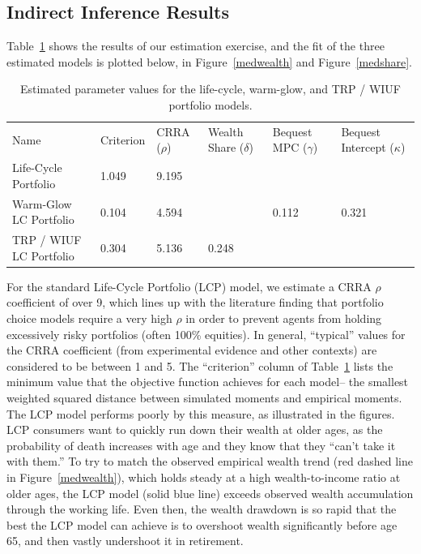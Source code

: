 \documentclass{article}
\newcommand{\CRRA}{\rho}
\begin{document}
\subsection{Indirect Inference Results}

Table~\ref{parameters} shows the results of our estimation exercise, and the fit of the three estimated models is plotted below, in Figure~\ref{medwealth} and Figure~\ref{medshare}.

\begin{table}
\centering
\caption[]{Estimated parameter values for the life-cycle, warm-glow, and TRP / WIUF portfolio models.}
\label{parameters}
\begin{tabular}{p{}p{}p{}p{}p{}p{}}
\toprule
Name & Criterion & CRRA ($\CRRA$) & Wealth Share ($\delta$) & Bequest MPC ($\gamma$) & Bequest Intercept ($\kappa$) \\
Life-Cycle Portfolio & 1.049 & 9.195 &  &  &  \\
Warm-Glow LC Portfolio & 0.104 & 4.594 &  & 0.112 & 0.321 \\
TRP / WIUF LC Portfolio & 0.304 & 5.136 & 0.248 &  &  \\
\bottomrule
\end{tabular}
\end{table}

For the standard Life-Cycle Portfolio (LCP) model, we estimate a CRRA $\CRRA$ coefficient of over 9, which lines up with the literature finding that portfolio choice models require a very high $\CRRA$ in order to prevent agents from holding excessively risky portfolios (often 100\% equities).
In general, ``typical'' values for the CRRA coefficient (from experimental evidence and other contexts) are considered to be between 1 and 5.
The ``criterion'' column of Table~\ref{parameters} lists the minimum value that the objective function achieves for each model-- the smallest weighted squared distance between simulated moments and empirical moments.
The LCP model performs poorly by this measure, as illustrated in the figures.
LCP consumers want to quickly run down their wealth at older ages, as the probability of death increases with age and they know that they ``can't take it with them.''
To try to match the observed empirical wealth trend (red dashed line in Figure~\ref{medwealth}), which holds steady at a high wealth-to-income ratio at older ages, the LCP model (solid blue line) exceeds observed wealth accumulation through the working life.
Even then, the wealth drawdown is so rapid that the best the LCP model can achieve is to overshoot wealth significantly before age 65, and then vastly undershoot it in retirement.
\end{document}
